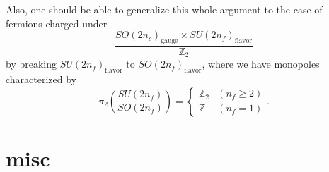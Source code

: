 \documentclass[12pt]{article}
\numberwithin{equation}{section}
\def\bZ{\mathbb{Z}}
\begin{document}
Also, one should be able to generalize this whole argument to the case of fermions charged under
\begin{equation*}
	\dfrac{SO(2n_c)_{\text{gauge}} \times SU(2n_f)_{\text{flavor}}}{\bZ_2}
\end{equation*}
by breaking $SU(2n_f)_{\text{flavor}}$ to $SO(2n_f)_{\text{flavor}}$,
where we have monopoles characterized by
\begin{equation*}
	\pi_2\left(
		\dfrac{SU(2n_f)}{SO(2n_f)}
	\right)
	=
	\left\{
		\begin{array}{cl}
			\bZ_2 & (n_f \geq 2)\\
			\bZ & (n_f = 1)
		\end{array}
	\right..
\end{equation*}

\newpage

\section{misc}
\end{document}
